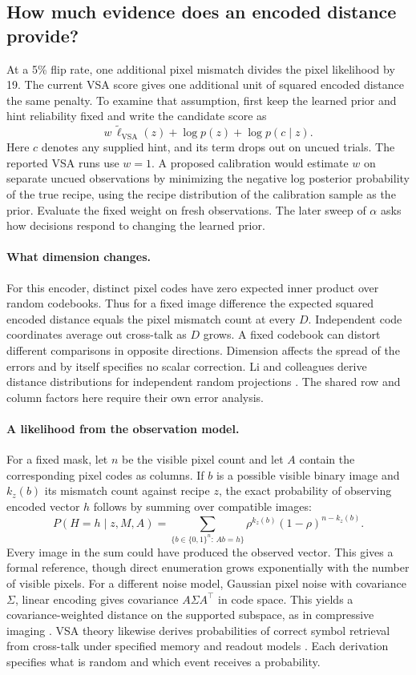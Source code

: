 \documentclass[11pt,letterpaper]{article}
\begin{document}
\subsection{How much evidence does an encoded distance provide?}
At a 5\% flip rate, one additional pixel mismatch divides the pixel likelihood by 19. The current VSA score gives one additional unit of squared encoded distance the same penalty. To examine that assumption, first keep the learned prior and hint reliability fixed and write the candidate score as
\[
 w\,\widetilde\ell_{\mathrm{VSA}}(z)+\log p(z)+\log p(c\mid z).
\]
Here $c$ denotes any supplied hint, and its term drops out on uncued trials. The reported VSA runs use $w=1$. A proposed calibration would estimate $w$ on separate uncued observations by minimizing the negative log posterior probability of the true recipe, using the recipe distribution of the calibration sample as the prior. Evaluate the fixed weight on fresh observations. The later sweep of $\alpha$ asks how decisions respond to changing the learned prior.

\paragraph{What dimension changes.}
For this encoder, distinct pixel codes have zero expected inner product over random codebooks. Thus for a fixed image difference the expected squared encoded distance equals the pixel mismatch count at every $D$. Independent code coordinates average out cross-talk as $D$ grows. A fixed codebook can distort different comparisons in opposite directions. Dimension affects the spread of the errors and by itself specifies no scalar correction. Li and colleagues derive distance distributions for independent random projections \cite{li2006}. The shared row and column factors here require their own error analysis.

\paragraph{A likelihood from the observation model.}
For a fixed mask, let $n$ be the visible pixel count and let $A$ contain the corresponding pixel codes as columns. If $b$ is a possible visible binary image and $k_z(b)$ its mismatch count against recipe $z$, the exact probability of observing encoded vector $h$ follows by summing over compatible images:
\[
 P(H=h\mid z,M,A)=
 \sum_{\{b\in\{0,1\}^n:\,Ab=h\}}
 \rho^{k_z(b)}(1-\rho)^{n-k_z(b)} .
\]
Every image in the sum could have produced the observed vector. This gives a formal reference, though direct enumeration grows exponentially with the number of visible pixels. For a different noise model, Gaussian pixel noise with covariance $\Sigma$, linear encoding gives covariance $A\Sigma A^\top$ in code space. This yields a covariance-weighted distance on the supported subspace, as in compressive imaging \cite{compressive2012}. VSA theory likewise derives probabilities of correct symbol retrieval from cross-talk under specified memory and readout models \cite{frady2018}. Each derivation specifies what is random and which event receives a probability.
\end{document}
